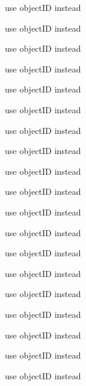 
\begin{DoxyRefList}
\item[\label{deprecated__deprecated000201}%
\Hypertarget{deprecated__deprecated000201}%
Member \hyperlink{protocolFBGraphPlace-p_a94e6e9afc56a6bc4969632f665758ff8}{\mbox{[}F\+B\+Graph\+Place-\/p \+\_\+\+\_\+attribute\+\_\+\+\_\+\mbox{]}} ]use object\+ID instead 

use object\+ID instead 

use object\+ID instead 

use object\+ID instead 

use object\+ID instead  
\item[\label{deprecated__deprecated000202}%
\Hypertarget{deprecated__deprecated000202}%
Member \hyperlink{protocolFBGraphUser-p_af9c6c49d1138ab6f19bf6759a18b53f9}{\mbox{[}F\+B\+Graph\+User-\/p \+\_\+\+\_\+attribute\+\_\+\+\_\+\mbox{]}} ]use object\+ID instead 

use object\+ID instead 

use object\+ID instead 

use object\+ID instead 

use object\+ID instead  
\item[\label{deprecated__deprecated000203}%
\Hypertarget{deprecated__deprecated000203}%
Member \hyperlink{protocolFBOpenGraphAction-p_a19948d4253cde780af8d45d030803063}{\mbox{[}F\+B\+Open\+Graph\+Action-\/p \+\_\+\+\_\+attribute\+\_\+\+\_\+\mbox{]}} ]use object\+ID instead 

use object\+ID instead 

use object\+ID instead 

use object\+ID instead 

use object\+ID instead  
\item[\label{deprecated__deprecated000204}%
\Hypertarget{deprecated__deprecated000204}%
Member \hyperlink{protocolFBOpenGraphObject-p_a91cba0c24949be9c3158598b20fc276e}{\mbox{[}F\+B\+Open\+Graph\+Object-\/p \+\_\+\+\_\+attribute\+\_\+\+\_\+\mbox{]}} ]use object\+ID instead 

use object\+ID instead 

use object\+ID instead 

use object\+ID instead 


\end{DoxyRefList}
